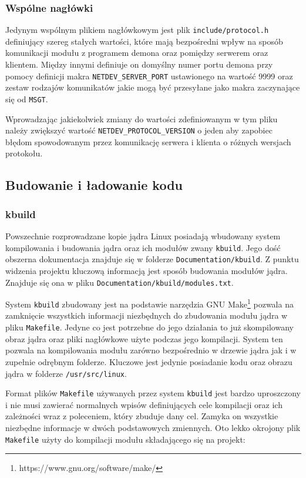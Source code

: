 \documentclass[10pt]{scrartcl}
\begin{document}
\subsubsection{Wspólne nagłówki}

Jedynym wspólnym plikiem nagłówkowym jest plik \texttt{include/protocol.h} definiujący szereg stałych wartości, które mają bezpośredni wpływ na sposób komunikacji modułu z programem demona oraz pomiędzy serwerem oraz klientem. Między innymi definiuje on domyślny numer portu demona przy pomocy definicji makra \texttt{NETDEV\_SERVER\_PORT} ustawionego na wartość 9999 oraz zestaw rodzajów komunikatów jakie mogą być przesyłane jako makra zaczynające się od \texttt{MSGT}.

Wprowadzając jakiekolwiek zmiany do wartości zdefiniowanym w tym pliku należy zwiększyć wartość \texttt{NETDEV\_PROTOCOL\_VERSION} o jeden aby zapobiec błędom spowodowanym przez komunikację serwera i klienta o różnych wersjach protokołu.

\subsection{Budowanie i ładowanie kodu}

\subsubsection{kbuild}

Powszechnie rozprowadzane kopie jądra Linux posiadają wbudowany system kompilowania i budowania jądra oraz ich modułów zwany \texttt{kbuild}. Jego dość obszerna dokumentacja znajduje się w folderze \texttt{Documentation/kbuild}. Z punktu widzenia projektu kluczową informacją jest sposób budowania modułów jądra. Znajduje się ona w pliku \texttt{Documentation/kbuild/modules.txt}.

System \texttt{kbuild} zbudowany jest na podstawie narzędzia GNU Make\footnote{https://www.gnu.org/software/make/} pozwala na zamknięcie wszystkich informacji niezbędnych do zbudowania modułu jądra w pliku \texttt{Makefile}. Jedyne co jest potrzebne do jego działania to już skompilowany obraz jądra oraz pliki nagłówkowe użyte podczas jego kompilacji. System ten pozwala na kompilowania modułu zarówno bezpośrednio w drzewie jądra jak i w zupełnie odrębnym folderze. Kluczowe jest jedynie posiadanie kodu oraz obrazu jądra w folderze \texttt{/usr/src/linux}.

Format plików \texttt{Makefile} używanych przez system \texttt{kbuild} jest bardzo uproszczony i nie musi zawierać normalnych wpisów definiujących cele kompilacji oraz ich zależności wraz z poleceniem, który zbuduje dany cel. Zamyka on wszystkie niezbędne informacje w dwóch podstawowych zmiennych. Oto lekko okrojony plik \texttt{Makefile} użyty do kompilacji modułu składającego się na projekt:
\end{document}
